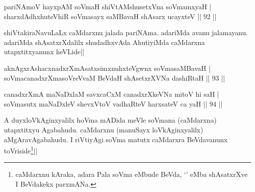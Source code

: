 
\begin{shl}
pariNAmoV hayxpAM soVmaH shiVtAMshusetxVna soV\s mamxyaH | \\
sharxdAdhxhuteVhiR soVmasayx saMBavaH shAsarx ucayxteV \hfill|| 92 || 
\end{shl}

\begin{artha}
shiVtakiraNavuLaLx caMdarxnu jalada pariNAma. adariMda avanu 
jalamayanu. adariMda shAsatxrXdalilx shudadhxvAda AhutiyiMda caMdarxna 
utapxtitxyanunx heVLide||
\end{artha}


\begin{shl}
aknAgxrAshacxnadxrXmAsatxsimxnuhxteV\s gwnx soVmasaMBavaH | \\
soVmacanadxrXmasoVreVvaM BeVdaH shAsetxrXVNa dashiRtaH \hfill|| 93 || 
\end{shl}

\begin{shl}
canadxrXmA maNaDxlaM savxcaCxM canadxrXkeVNa mitoV hi saH | \\
soVmasutx maNaDxleV shevxVtoV vadhaRteV harxsateV ca yaH \hfill|| 94 || 
\end{shl}

\begin{artha}
A duyxloVkAginxyalilx hoVma mADida meVle soVmana (caMdarxna) 
utapxtitxyu Agabahudu. caMdarxnu (manuSayx loVkAginxyalilx) 
aMgAravAgabahudu. I riVtiyAgi soVma matutx caMdarxra BeVdavanunx 
toVriside\footnote[2]{caMdarxnu kAraka, adara Pala soVma eMbude BeVda, 
`\stext' eMba shAsatxrXve I BeVdakekx parxmANa.}||
\end{artha}


